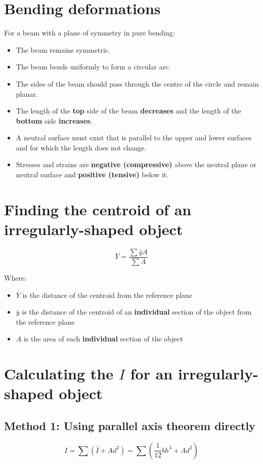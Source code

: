 \documentclass[11pt]{article}
\begin{document}
\section{Bending deformations}
\label{sec:org413f0a5}
For a beam with a plane of symmetry in pure bending:
\begin{itemize}
\item The beam remains symmetric.
\item The beam bends uniformly to form a circular arc.
\item The sides of the beam should pass through the centre of the circle and remain planar.
\item The length of the \textbf{top} side of the beam \textbf{decreases} and the length of the \textbf{bottom} side \textbf{increases}.
\item A neutral surface must exist that is parallel to the upper and lower surfaces and for which the length does not change.
\item Stresses and strains are \textbf{negative (compressive)} above the neutral plane or neutral surface and \textbf{positive (tensive)} below it.
\end{itemize}
\section{Finding the centroid of an irregularly-shaped object}
\label{sec:orgae6b260}
\[\bar{Y} = \frac{\sum \bar{y} A}{\sum A}\]

Where:
\begin{itemize}
\item \(\bar{Y}\) is the distance of the centroid from the reference plane
\item \(\bar{y}\) is the distance of the centroid of an \textbf{individual} section of the object from the reference plane
\item \(A\) is the area of each \textbf{individual} section of the object
\end{itemize}
\section{Calculating the \(I\) for an irregularly-shaped object}
\label{sec:org1187a74}

\subsection{Method 1: Using parallel axis theorem directly}
\label{sec:org3da4fdc}
\[I = \sum \left(\bar{I} + Ad^2 \right) = \sum \left(\frac{1}{12} bh^3 + Ad^2 \right)\]
\end{document}
